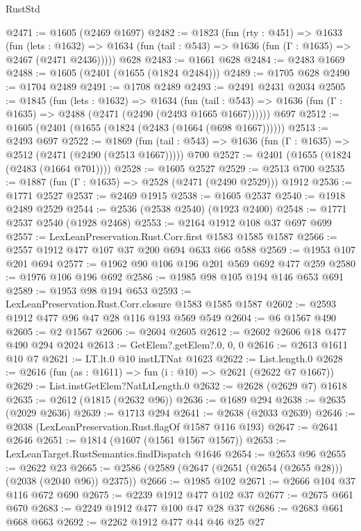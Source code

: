 \begin{lexlean}{RustStd}
\begin{coremodule}
@2471 := @1605 (@2469 @1697)
@2482 := @1823
    (fun (rty : @451) =>
    @1633
      (fun (lets : @1632) =>
      @1634 (fun (tail : @543) => @1636 (fun (Γ : @1635) => @2467 (@2471 @2436)))))
    @628
@2483 := @1661 @628
@2484 := @2483 @1669
@2488 := @1605 (@2401 (@1655 (@1824 @2484)))
@2489 := @1705 @628
@2490 := @1704 @2489
@2491 := @1708 @2489
@2493 := @2491 @2431 @2034
@2505 := @1845
    (fun (lets : @1632) =>
    @1634
      (fun (tail : @543) => @1636 (fun (Γ : @1635) => @2488 (@2471 (@2490 (@2493 @1665 @1667))))))
    @697
@2512 := @1605 (@2401 (@1655 (@1824 (@2483 (@1664 (@698 @1667))))))
@2513 := @2493 @697
@2522 := @1869
    (fun (tail : @543) => @1636 (fun (Γ : @1635) => @2512 (@2471 (@2490 (@2513 @1667)))))
    @700
@2527 := @2401 (@1655 (@1824 (@2483 (@1664 @701))))
@2528 := @1605 @2527
@2529 := @2513 @700
@2535 := @1887 (fun (Γ : @1635) => @2528 (@2471 (@2490 @2529))) @1912
@2536 := @1771 @2527
@2537 := @2469 @1915
@2538 := @1605 @2537
@2540 := @1918 @2489 @2529
@2544 := @2536 (@2538 @2540) (@1923 @2400)
@2548 := @1771 @2537 @2540 (@1928 @2468)
@2553 := @2164 @1912 @108 @37 @697 @699
@2557 := LexLeanPreservation.Rust.Corr.first @1583 @1585 @1587
@2566 := @2557 @1912 @477 @107 @37 @200 @694 @633 @66 @588
@2569 := @1953 @107 @201 @694
@2577 := @1962 @90 @106 @196 @201 @569 @692 @477 @259
@2580 := @1976 @106 @196 @692
@2586 := @1985 @98 @105 @194 @146 @653 @691
@2589 := @1953 @98 @194 @653
@2593 := LexLeanPreservation.Rust.Corr.closure @1583 @1585 @1587
@2602 := @2593 @1912 @477 @96 @47 @28 @116 @193 @569 @549
@2604 := @6 @1567 @490
@2605 := @2 @1567
@2606 := @2604 @2605
@2612 := @2602 @2606 @18 @477 @490 @294 @2024
@2613 := GetElem?.getElem?.{0, 0, 0}
@2616 := @2613 @1611 @10 @7
@2621 := LT.lt.{0} @10 instLTNat @1623
@2622 := List.length.{0}
@2628 := @2616 (fun (as : @1611) => fun (i : @10) => @2621 (@2622 @7 @1667))
@2629 := List.instGetElem?NatLtLength.{0}
@2632 := @2628 (@2629 @7) @1618
@2635 := @2612 (@1815 (@2632 @96))
@2636 := @1689 @294
@2638 := @2635 (@2029 @2636)
@2639 := @1713 @294
@2641 := @2638 (@2033 @2639)
@2646 := @2038 (LexLeanPreservation.Rust.flagOf @1587 @116 @193)
@2647 := @2641 @2646
@2651 := @1814 (@1607 (@1561 @1567 @1567))
@2653 := LexLeanTarget.RustSemantics.findDispatch @1646
@2654 := @2653 @96
@2655 := @2622 @23
@2665 := @2586 (@2589 (@2647 (@2651 (@2654 (@2655 @28))) (@2038 (@2040 @96)) @2375))
@2666 := @1985 @102
@2671 := @2666 @104 @37 @116 @672 @690
@2675 := @2239 @1912 @477 @102 @37
@2677 := @2675 @661 @670
@2683 := @2249 @1912 @477 @100 @47 @28 @37
@2686 := @2683 @661 @668 @663
@2692 := @2262 @1912 @477 @44 @46 @25 @27

\end{coremodule}
\end{lexlean}
